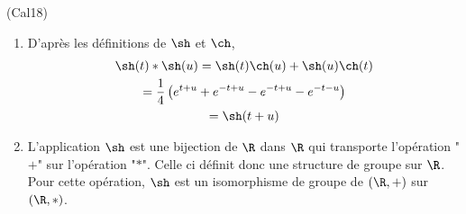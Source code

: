 \begin{tiny}(Cal18)\end{tiny}
\begin{enumerate}
 \item D'après les définitions de $\sh$ et $\ch$,
\begin{multline*}
 \sh(t)*\sh(u)=\sh(t)\ch(u)+\sh(u)\ch(t)\\
=\frac{1}{4}\left(e^{t+u}+e^{-t+u}-e^{-t+u}-e^{-t-u} \right)\\
=\sh(t+u) 
\end{multline*}
\item L'application $\sh$ est une bijection de $\R$ dans $\R$ qui transporte l'opération "$+$" sur l'opération "$*$". Celle ci définit donc une structure de groupe sur $\R$. Pour cette opération, $\sh$ est un isomorphisme de groupe de $(\R,+)$ sur $(\R,*)$.
\end{enumerate}
 